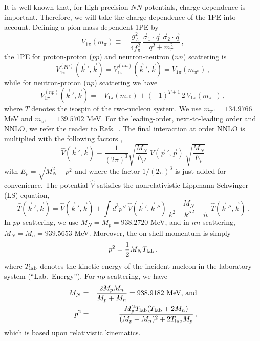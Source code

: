 It is well known that, for high-precision $NN$ potentials, charge
dependence is important.  Therefore, we will take the charge
dependence of the 1PE into account.  Defining a pion-mass dependent
1PE by
\[
V_{1\pi} (m_\pi) \equiv - \,
\frac{g_A^2}{4f_\pi^2} \, \frac{ \vec \sigma_1 \cdot \vec q \,\, \vec
  \sigma_2 \cdot \vec q} {q^2 + m_\pi^2} \,,
\]
the 1PE for proton-proton ($pp$) and neutron-neutron ($nn$) scattering
is
\[
V_{1\pi}^{(pp)} ({\vec k}~', \vec k) = V_{1\pi}^{(nn)} ({\vec k}~',
\vec k) = V_{1\pi} (m_{\pi^0}) \,,
\]
while for neutron-proton ($np$) scattering we have
\[
V_{1\pi}^{(np)} ({\vec k}~', \vec k) = -V_{1\pi} (m_{\pi^0}) +
(-1)^{T+1}\, 2\, V_{1\pi} (m_{\pi^\pm}) \,,
\]
where $T$ denotes the isospin of the two-nucleon system.  We use
$m_{\pi^0}=134.9766$ MeV and $m_{\pi^\pm}=139.5702$ MeV.  For the
leading-order, next-to-leading order and NNLO, we refer the reader to
Refs.~\cite{machleidt2011,carlsson2014}.  The final interaction at
order NNLO is multiplied with the following factors
\cite{machleidt2011},
\begin{equation}
\widehat{V}({\vec k}~',{\vec k}) \equiv \frac{1}{(2\pi)^3}
\sqrt{\frac{M_N}{E_{p'}}}\: {V}({\vec p}~',{\vec p})\:
\sqrt{\frac{M_N}{E_{p}}}
\label{eq_minrel1}
\end{equation}
with $E_p=\sqrt{M_N^2+p^2}$ and where the factor $1/(2\pi)^3$ is just
added for convenience.  The potential $\widehat{V}$ satisfies the
nonrelativistic Lippmann-Schwinger (LS) equation,
\begin{equation}
 \widehat{T}({\vec k}~',{\vec k})= \widehat{V}({\vec k}~',{\vec k})+
 \int d^3p''\: \widehat{V}({\vec k}~',{\vec k}~'')\: \frac{M_N} {{
     k}^{2}-{k''}^{2}+i\epsilon}\: \widehat{T}({\vec k}~'',{\vec k})
 \, .
\label{eq_LS}
\end{equation}
In $pp$ scattering, we use $M_N=M_p=938.2720$ MeV, and in $nn$
scattering, $M_N=M_n=939.5653$ MeV.  Moreover, the on-shell momentum
is simply
\begin{equation}
p^2 = \frac12 M_N T_{\rm lab} \,,
\end{equation}
where $T_{\rm lab}$ denotes the kinetic energy of the incident nucleon
in the laboratory system (``Lab.\ Energy'').  For $np$ scattering, we
have
\begin{eqnarray}
M_N &=& \frac{2M_pM_n}{M_p+M_n} = 938.9182 \mbox{ MeV, and} \\ p^2 & =
& \frac{M_p^2 T_{\rm lab} (T_{\rm lab} + 2M_n)} {(M_p + M_n)^2 +
  2T_{\rm lab} M_p} \,,
\end{eqnarray}
which is based upon relativistic kinematics.

